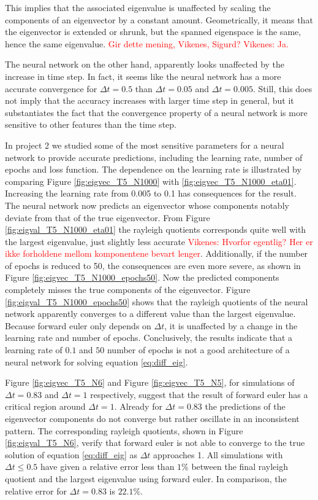 \documentclass[12pt]{extarticle}
\begin{document}
This implies that the associated eigenvalue is unaffected by scaling the components of an eigenvector by a constant amount. Geometrically, it means that the eigenvector is extended or shrunk, but the spanned eigenspace is the same, hence the same eigenvalue. \textcolor{red}{Gir dette mening, Vikenes, Sigurd? Vikenes: Ja.}

The neural network on the other hand, apparently looks unaffected by the increase in time step. In fact, it seems like the neural network has a more accurate convergence for $\Delta t = 0.5$ than $\Delta t = 0.05$ and $\Delta t = 0.005$. Still, this does not imply that the accuracy increases with larger time step in general, but it substantiates the fact that the convergence property of a neural network is more sensitive to other features than the time step. 

In project 2 we studied some of the most sensitive parameters for a neural network to provide accurate predictions, including the learning rate, number of epochs and loss function. The dependence on the learning rate is illustrated by comparing Figure \ref{fig:eigvec_T5_N1000} with \ref{fig:eigvec_T5_N1000_eta01}. Increasing the learning rate from 0.005 to 0.1 has consequences for the result. The neural network now predicts an eigenvector whose components notably deviate from that of the true eigenvector. From Figure \ref{fig:eigval_T5_N1000_eta01} the rayleigh quotients corresponds quite well with the largest eigenvalue, just slightly less accurate \textcolor{red}{Vikenes: Hvorfor egentlig? Her er ikke forholdene mellom komponentene bevart lenger}. Additionally, if the number of epochs is reduced to 50, the consequences are even more severe, as shown in Figure \ref{fig:eigvec_T5_N1000_epochs50}. Now the predicted components completely misses the true components of the eigenvector. Figure \ref{fig:eigval_T5_N1000_epochs50} shows that the rayleigh quotients of the neural network apparently converges to a different value than the largest eigenvalue. Because forward euler only depends on $\Delta t$, it is unaffected by a change in the learning rate and number of epochs. Conclusively, the results indicate that a learning rate of $0.1$ and $50$ number of epochs is not a good architecture of a neural network for solving equation \eqref{eq:diff_eig}.


Figure \ref{fig:eigvec_T5_N6} and Figure \ref{fig:eigvec_T5_N5}, for simulations of $\Delta t=0.83$ and $\Delta t = 1$ respectively, suggest that the result of forward euler has a critical region around $\Delta t = 1$. Already for $\Delta t = 0.83$ the predictions of the eigenvector components do not converge but rather oscillate in an inconsistent pattern. The corresponding rayleigh quotients, shown in Figure \ref{fig:eigval_T5_N6}, verify that forward euler is not able to converge to the true solution of equation \eqref{eq:diff_eig} as $\Delta t$ approaches 1. All simulations with $\Delta t \leq 0.5$ have given a relative error less than $1\%$ between the final rayleigh quotient and the largest eigenvalue using forward euler. In comparison, the relative error for $\Delta t = 0.83$ is $22.1\%$.
\end{document}
